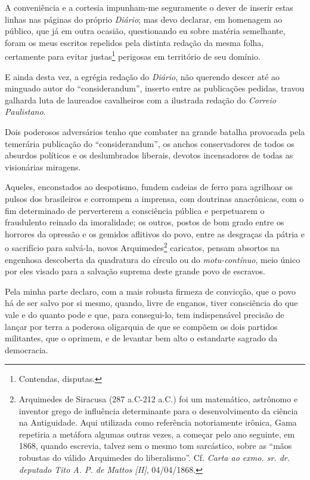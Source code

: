 A conveniência e a cortesia impunham-me seguramente o dever de inserir
estas linhas nas páginas do próprio \emph{Diário}; mas devo declarar, em
homenagem ao público, que já em outra ocasião, questionando eu sobre
matéria semelhante, foram os meus escritos repelidos pela distinta
redação da mesma folha, certamente para evitar justas\footnote{
  Contendas, disputas.} perigosas em território de seu domínio.

E ainda desta vez, a egrégia redação do \emph{Diário}, não querendo
descer até ao minguado autor do ``considerandum'', inserto entre as
publicações pedidas, travou galharda luta de laureados cavalheiros com a
ilustrada redação do \emph{Correio Paulistano}.

Dois poderosos adversários tenho que combater na grande batalha
provocada pela temerária publicação do ``considerandum'', os anchos
conservadores de todos os absurdos políticos e os deslumbrados liberais,
devotos incensadores de todas as visionárias miragens.

Aqueles, enconstados ao despotismo, fundem cadeias de ferro para
agrilhoar os pulsos dos brasileiros e corrompem a imprensa, com
doutrinas anacrônicas, com o fim determinado de perverterem a
consciência pública e perpetuarem o fraudulento reinado da imoralidade;
os outros, postos de bom grado entre os horrores da opressão e os
gemidos aflitivos do povo, entre as desgraças da pátria e o sacrifício
para salvá-la, novos Arquimedes\footnote{Arquimedes de Siracusa (287
  a.C-212 a.C.) foi um matemático, astrônomo e inventor grego de
  influência determinante para o desenvolvimento da ciência na
  Antiguidade. Aqui utilizada como referência notoriamente irônica, Gama
  repetiria a metáfora algumas outras vezes, a começar pelo ano
  seguinte, em 1868, quando escrevia, talvez sem o mesmo tom sarcástico,
  sobre as ``mãos robustas do válido Arquimedes do liberalismo''. Cf.
  \emph{Carta ao exmo. sr. dr. deputado Tito A. P. de Mattos {[}II{]}},
  04/04/1868.} caricatos, pensam absortos na engenhosa descoberta da
quadratura do círculo ou do \emph{motu-contínuo}, meio único por eles
visado para a salvação suprema deste grande povo de escravos.

Pela minha parte declaro, com a mais robusta firmeza de convicção, que o
povo há de ser salvo por si mesmo, quando, livre de enganos, tiver
consciência do que vale e do quanto pode e que, para consegui-lo, tem
indispensável precisão de lançar por terra a poderosa oligarquia de que
se compõem os dois partidos militantes, que o oprimem, e de levantar bem
alto o estandarte sagrado da democracia.

